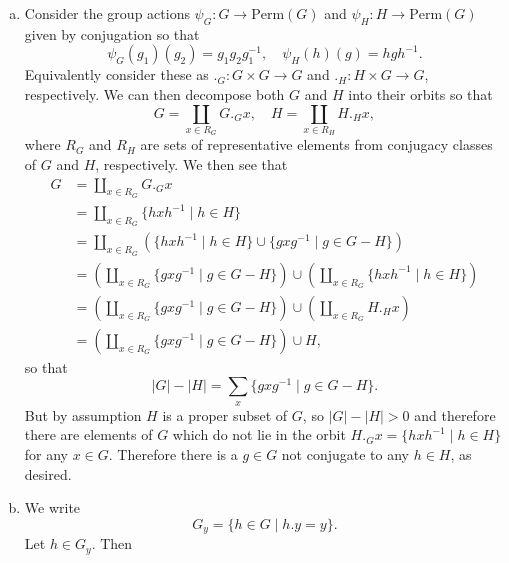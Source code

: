 \documentclass{article}
\begin{document}
\begin{Answer}
  \begin{enumerate}[(a)]
    \item{
      Consider the group actions
      $\psi_G : G \to \mathrm{Perm}(G)$ and
      $\psi_H : H \to \mathrm{Perm}(G)$ given by conjugation
      so that
      $$
      \psi_G(g_1)(g_2) = g_1 g_2 g_1^{-1}, \quad
      \psi_H(h)(g) = h g h^{-1}.
      $$
      Equivalently consider these as
      $._G : G \times G \to G$ and $._H : H \times G \to G$, respectively.
      We can then decompose both $G$ and $H$ into their orbits so that
      $$
      G = \coprod_{x \in R_G} G ._G x, \quad
      H = \coprod_{x \in R_H} H ._H x,
      $$
      where $R_G$ and $R_H$ are sets of representative elements from
      conjugacy classes of $G$ and $H$, respectively.
      We then see that
      \begin{align*}
        G &= \coprod_{x \in R_G} G ._G x \\
          &= \coprod_{x \in R_G} \{ h x h^{-1} \mid h \in H \} \\
          &= \coprod_{x \in R_G} \left(
               \{ h x h^{-1} \mid h \in H \}
               \cup
               \{ g x g^{-1} \mid g \in G - H \}
             \right) \\
          &= \left(\coprod_{x \in R_G} 
               \{ g x g^{-1} \mid g \in G - H \}
             \right)
             \cup
             \left(\coprod_{x \in R_G}
               \{ h x h^{-1} \mid h \in H \}
             \right) \\
          &= \left(\coprod_{x \in R_G} 
               \{ g x g^{-1} \mid g \in G - H \}
             \right)
             \cup
             \left(\coprod_{x \in R_G}
               H ._H x
             \right) \\
          &= \left(\coprod_{x \in R_G} 
               \{ g x g^{-1} \mid g \in G - H \}
             \right)
             \cup H,
      \end{align*}
      so that
      $$
      |G| - |H| = \sum_{x} \{ g x g^{-1} \mid g \in G - H \}.
      $$
      But by assumption $H$ is a proper subset of $G$, so
      $|G| - |H| > 0$ and therefore there are elements 
      of $G$ which do not lie in the
      orbit $H ._G x = \{ h x h^{-1} \mid h \in H \}$ for any
      $x \in G$. Therefore there is a $g \in G$
      not conjugate to any $h \in H$, as desired.
    }
    \item{
      We write
      $$
      G_y = \{ h \in G \mid h . y = y \}.
      $$
      Let $h \in G_y$. Then
}
\end{enumerate}
\end{Answer}
\end{document}
